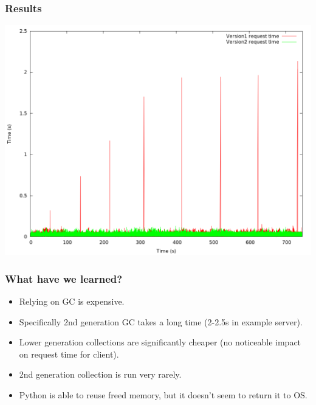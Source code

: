\documentclass{beamer}
\begin{document}
    \begin{frame}
        \frametitle{Results}
        \includegraphics[height=0.8\textheight]{request_time.png}
    \end{frame}

    \begin{frame}
        \frametitle{What have we learned?}
        \begin{itemize}
            \item Relying on GC is expensive.
            \item Specifically 2nd generation GC takes a long time (2-2.5s in example server).
            \item Lower generation collections are significantly cheaper (no noticeable impact on request time for client).
            \item 2nd generation collection is run very rarely.
            \item Python is able to reuse freed memory, but it doesn't seem to return it to OS.
        \end{itemize}
    \end{frame}
\end{document}
